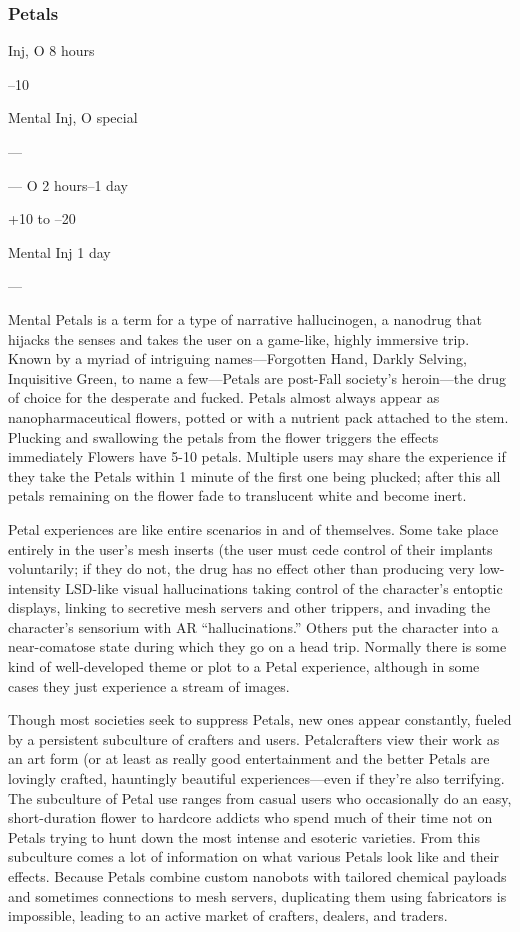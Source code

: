 \subsubsection{Petals}

Inj, O
8 hours

–10

Mental
Inj, O
special

—

—
O
2 hours–1 day

+10 to –20

Mental
Inj
1 day

—

Mental
Petals is a term for a type of narrative hallucinogen, 
a nanodrug that hijacks the senses and takes the user 
on a game-like, highly immersive trip. Known by a 
myriad of intriguing names—Forgotten Hand, Darkly 
Selving, Inquisitive Green, to name a few—Petals are 
post-Fall society's heroin—the drug of choice for the 
desperate and fucked. Petals almost always appear as 
nanopharmaceutical flowers, potted or with a nutrient 
pack attached to the stem. Plucking and swallowing 
the petals from the flower triggers the effects immediately
Flowers have 5-10 petals. Multiple users may
share the experience if they take the Petals within 1 
minute of the first one being plucked; after this all 
petals remaining on the flower fade to translucent 
white and become inert.

Petal experiences are like entire scenarios in and of 
themselves. Some take place entirely in the user's mesh 
inserts (the user must cede control of their implants 
voluntarily; if they do not, the drug has no effect other 
than producing very low-intensity LSD-like visual hallucinations
taking control of the character's entoptic
displays, linking to secretive mesh servers and other 
trippers, and invading the character's sensorium with 
AR ``hallucinations.'' Others put the character into a 
near-comatose state during which they go on a head 
trip. Normally there is some kind of well-developed 
theme or plot to a Petal experience, although in some 
cases they just experience a stream of images.

Though most societies seek to suppress Petals, new 
ones appear constantly, fueled by a persistent subculture
of crafters and users. Petalcrafters view their
work as an art form (or at least as really good entertainment
and the better Petals are lovingly crafted,
hauntingly beautiful experiences—even if they're also 
terrifying. The subculture of Petal use ranges from 
casual users who occasionally do an easy, short-duration
flower to hardcore addicts who spend much of
their time not on Petals trying to hunt down the most 
intense and esoteric varieties. From this subculture 
comes a lot of information on what various Petals 
look like and their effects. Because Petals combine 
custom nanobots with tailored chemical payloads and 
sometimes connections to mesh servers, duplicating 
them using fabricators is impossible, leading to an 
active market of crafters, dealers, and traders.

